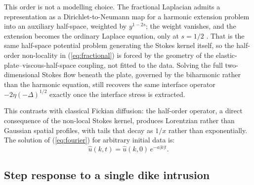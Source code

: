 \documentclass[extra]{gji}
\begin{document}
This order is not a modelling choice. The fractional Laplacian admits a
representation as a Dirichlet-to-Neumann map for a harmonic extension
problem into an auxiliary half-space, weighted by $y^{1-2s}$; the weight
vanishes, and the extension becomes the ordinary Laplace equation, only at
$s=1/2$ \citep{caffarelli2007extension,daoud2022fractional}. That is the
same half-space potential problem generating the Stokes kernel itself, so
the half-order non-locality in (\ref{eq:fractional}) is forced by the
geometry of the elastic-plate--viscous-half-space coupling, not fitted to
the data. Solving the full two-dimensional Stokes flow beneath the plate,
governed by the biharmonic rather than the harmonic equation, still
recovers the same interface operator $-2\eta(-\Delta)^{1/2}$ exactly once
the interface stress is extracted.

This contrasts with classical Fickian diffusion: the half-order operator, a
direct consequence of the non-local Stokes kernel, produces Lorentzian rather
than Gaussian spatial profiles, with tails that decay as $1/x$ rather than
exponentially. The solution of (\ref{eq:fourier}) for arbitrary initial data is:
\begin{equation}
\hat{u}(k,t) = \hat{u}(k,0)\,e^{-a|k|t}.
\label{eq:fourier_sol}
\end{equation}

\subsection{Step response to a single dike intrusion}
\label{sec:step}
\end{document}
